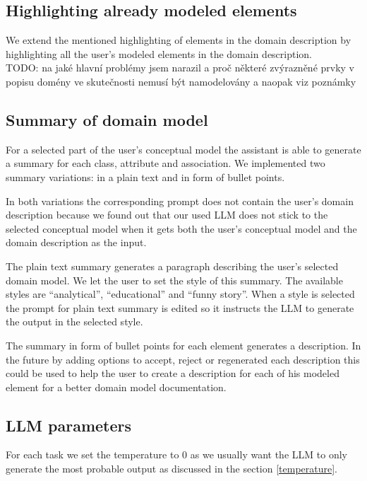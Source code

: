 \subsection{Highlighting already modeled elements}

We extend the mentioned highlighting of elements in the domain description by highlighting all the user's modeled elements in the domain description. \\

TODO: na jaké hlavní problémy jsem narazil a proč některé zvýrazněné prvky v popisu domény ve skutečnosti nemusí být namodelovány a naopak viz poznámky \\


\subsection{Summary of domain model}

For a selected part of the user's conceptual model the assistant is able to generate a summary for each class, attribute and association. We implemented two summary variations: in a plain text and in form of bullet points.

In both variations the corresponding prompt does not contain the user's domain description because we found out that our used LLM does not stick to the selected conceptual model when it gets both the user's conceptual model and the domain description as the input.

The plain text summary generates a paragraph describing the user's selected domain model. We let the user to set the style of this summary. The available styles are ``analytical'', ``educational'' and ``funny story''. When a style is selected the prompt for plain text summary is edited so it instructs the LLM to generate the output in the selected style.

The summary in form of bullet points for each element generates a description. In the future by adding options to accept, reject or regenerated each description this could be used to help the user to create a description for each of his modeled element for a better domain model documentation.


\subsection{LLM parameters}

For each task we set the temperature to $0$ as we usually want the LLM to only generate the most probable output as discussed in the section \ref{temperature}.

